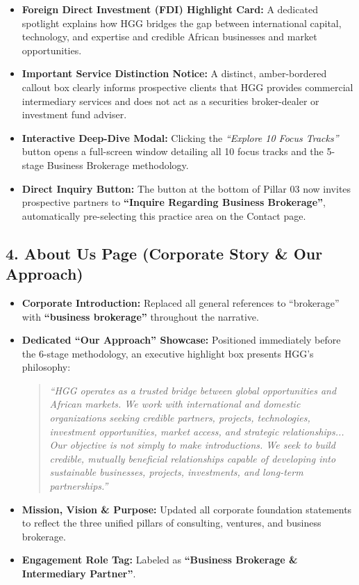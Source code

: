 \documentclass[11pt,a4paper]{article}
\begin{document}
\begin{itemize}[leftmargin=*]
    \item \textbf{Foreign Direct Investment (FDI) Highlight Card:} A dedicated spotlight explains how HGG bridges the gap between international capital, technology, and expertise and credible African businesses and market opportunities.
    \item \textbf{Important Service Distinction Notice:} A distinct, amber-bordered callout box clearly informs prospective clients that HGG provides commercial intermediary services and does not act as a securities broker-dealer or investment fund adviser.
    \item \textbf{Interactive Deep-Dive Modal:} Clicking the \textit{``Explore 10 Focus Tracks''} button opens a full-screen window detailing all 10 focus tracks and the 5-stage Business Brokerage methodology.
    \item \textbf{Direct Inquiry Button:} The button at the bottom of Pillar 03 now invites prospective partners to \textbf{``Inquire Regarding Business Brokerage''}, automatically pre-selecting this practice area on the Contact page.
\end{itemize}

\newpage

\subsection{4. About Us Page (Corporate Story \& Our Approach)}
\begin{itemize}[leftmargin=*]
    \item \textbf{Corporate Introduction:} Replaced all general references to ``brokerage'' with \textbf{``business brokerage''} throughout the narrative.
    \item \textbf{Dedicated ``Our Approach'' Showcase:} Positioned immediately before the 6-stage methodology, an executive highlight box presents HGG's philosophy:
    \begin{quote}
    \textit{``HGG operates as a trusted bridge between global opportunities and African markets. We work with international and domestic organizations seeking credible partners, projects, technologies, investment opportunities, market access, and strategic relationships... Our objective is not simply to make introductions. We seek to build credible, mutually beneficial relationships capable of developing into sustainable businesses, projects, investments, and long-term partnerships.''}
    \end{quote}
    \item \textbf{Mission, Vision \& Purpose:} Updated all corporate foundation statements to reflect the three unified pillars of consulting, ventures, and business brokerage.
    \item \textbf{Engagement Role Tag:} Labeled as \textbf{``Business Brokerage \& Intermediary Partner''}.
\end{itemize}
\end{document}
